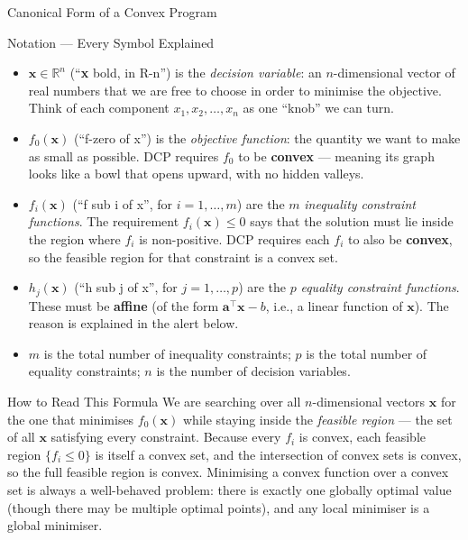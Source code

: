 \documentclass[aspectratio=169,10pt]{beamer}
\begin{document}
\begin{frame}[allowframebreaks]{Canonical Form of a Convex Program}
  \begin{block}{Notation --- Every Symbol Explained}
    \begin{itemize}
      \item $\mathbf{x} \in \mathbb{R}^n$ (``\textbf{x} bold, in
            R-n'') is the \emph{decision variable}: an $n$-dimensional
            vector of real numbers that we are free to choose in order
            to minimise the objective.  Think of each component
            $x_1, x_2, \ldots, x_n$ as one ``knob'' we can turn.
      \item $f_0(\mathbf{x})$ (``f-zero of x'') is the \emph{objective
            function}: the quantity we want to make as small as possible.
            DCP requires $f_0$ to be \textbf{convex} --- meaning its
            graph looks like a bowl that opens upward, with no
            hidden valleys.
      \item $f_i(\mathbf{x})$ (``f sub i of x'', for $i = 1,\ldots,m$)
            are the $m$ \emph{inequality constraint functions}.  The
            requirement $f_i(\mathbf{x}) \leq 0$ says that the solution
            must lie inside the region where $f_i$ is non-positive.
            DCP requires each $f_i$ to also be \textbf{convex}, so the
            feasible region for that constraint is a convex set.
      \item $h_j(\mathbf{x})$ (``h sub j of x'', for $j = 1,\ldots,p$)
            are the $p$ \emph{equality constraint functions}.  These
            must be \textbf{affine} (of the form
            $\mathbf{a}^{\top}\mathbf{x} - b$, i.e., a linear function
            of $\mathbf{x}$).  The reason is explained in the alert
            below.
      \item $m$ is the total number of inequality constraints; $p$ is
            the total number of equality constraints; $n$ is the number
            of decision variables.
    \end{itemize}
  \end{block}

  \begin{alertblock}{How to Read This Formula}
    We are searching over all $n$-dimensional vectors $\mathbf{x}$ for
    the one that minimises $f_0(\mathbf{x})$ while staying inside the
    \emph{feasible region} --- the set of all $\mathbf{x}$ satisfying
    every constraint.  Because every $f_i$ is convex, each feasible
    region $\{f_i \leq 0\}$ is itself a convex set, and the
    intersection of convex sets is convex, so the full feasible region
    is convex.  Minimising a convex function over a convex set is
    always a well-behaved problem: there is exactly one globally optimal
    value (though there may be multiple optimal points), and any local
    minimiser is a global minimiser.
  \end{alertblock}


\end{frame}
\end{document}
